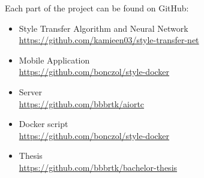 \documentclass[../Main.tex]{subfiles}
\begin{document}
    Each part of the project can be found on GitHub:

    \begin{itemize}
        \item{
        Style Transfer Algorithm and Neural Network \\
        \url{https://github.com/kamieen03/style-transfer-net}
            }
        \item{ 
        Mobile Application \\
        \url{https://github.com/bonczol/style-docker}
            }
        \item {
        Server \\
        \url{https://github.com/bbbrtk/aiortc}
            }
        \item {
        Docker script \\
        \url{https://github.com/bonczol/style-docker}
            }
        \item {
        Thesis \\
        \url{https://github.com/bbbrtk/bachelor-thesis}
        }
    \end{itemize}
\biblio %
\end{document}
